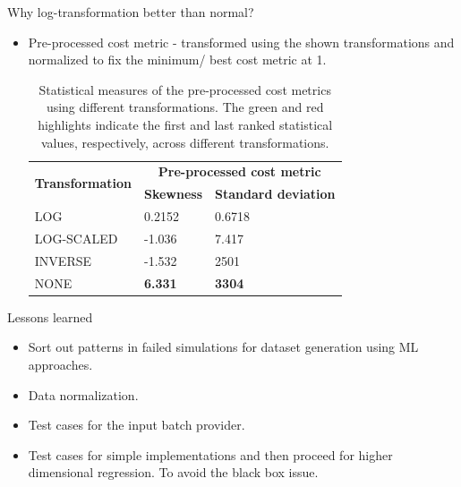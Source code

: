 \documentclass[10pt]{beamer}
\begin{document}
\begin{frame}[t]{Why log-transformation better than normal?}

\begin{itemize}
\item Pre-processed cost metric - transformed using the shown transformations and normalized to fix the minimum/ best cost metric at 1.  
    
\begin{table}[!h]
\centering
\begin{tabular}{|l|l|l|}
\hline
\multicolumn{1}{|c|}{\multirow{2}{*}{\textbf{Transformation}}} & \multicolumn{2}{c|}{\textbf{Pre-processed cost metric}} \\ \cline{2-3} 
\multicolumn{1}{|c|}{} & \multicolumn{1}{c|}{\textbf{Skewness}} & \multicolumn{1}{c|}{\textbf{Standard deviation}} \\ \hline
LOG & \color{green}0.2152 & \color{green}0.6718\\ \hline
LOG-SCALED & -1.036 & 7.417 \\ \hline
INVERSE & -1.532 & 2501 \\ \hline
NONE & \color{red}\textbf{6.331} & \color{red}\textbf{3304} \\ \hline
\end{tabular}
\captionsetup{justification=justified}
\caption[Statistical measures of the pre-processed cost metrics]{Statistical measures of the pre-processed cost metrics using different transformations. The green and red highlights indicate the first and last ranked statistical values, respectively, across different transformations.}
\label{table:skewness}
\end{table}

\end{itemize}
\end{frame}

\begin{frame}[t]{Lessons learned}
\begin{itemize}
\item Sort out patterns in failed simulations for dataset generation using ML approaches.
\item Data normalization.
\item Test cases for the input batch provider.
\item Test cases for simple implementations and then proceed for higher dimensional regression. To avoid the black box issue.
\end{itemize}
\end{frame}
\end{document}
